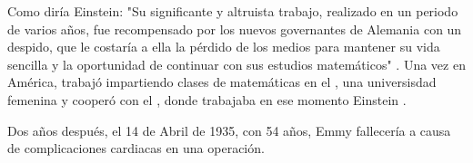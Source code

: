 Como diría Einstein: "Su significante y altruista trabajo, realizado en un periodo de varios años, fue recompensado por los nuevos governantes de Alemania con un despido, que le costaría a ella la pérdido de los medios para mantener su vida sencilla y la oportunidad de continuar con sus estudios matemáticos" \cite{Einstein}.
Una vez en América, trabajó impartiendo clases de matemáticas en el , una universisdad femenina y cooperó con el , donde trabajaba en ese momento Einstein \cite{Carrasco}.

Dos años después, el 14 de Abril de 1935, con 54 años, Emmy fallecería a causa de complicaciones cardiacas en una operación.